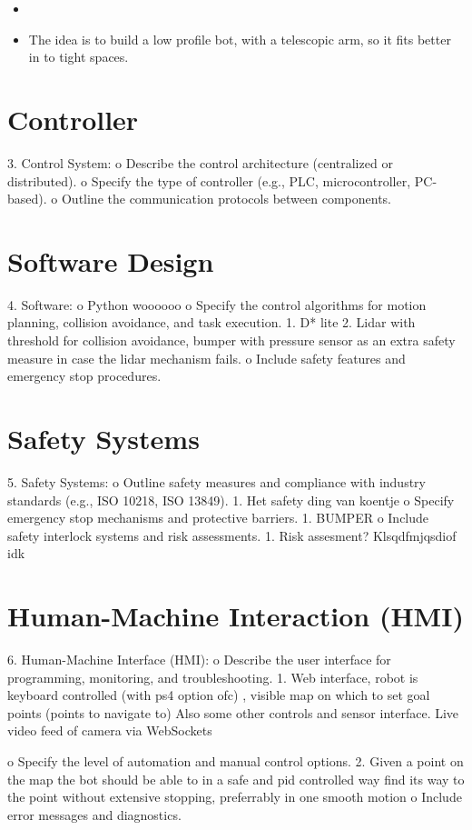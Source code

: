 \documentclass[a4paper]{article}
\begin{document}
\begin{itemize}
    \item 
    \item The idea is to build a low profile bot, with a telescopic arm, so it fits better in to tight spaces.
\end{itemize}

\section*{Controller}
3.	Control System:
o	Describe the control architecture (centralized or distributed).
o	Specify the type of controller (e.g., PLC, microcontroller, PC-based).
o	Outline the communication protocols between components.

\section*{Software Design}
4.	Software:
o	Python woooooo
o	Specify the control algorithms for motion planning, collision avoidance, and task execution.
1.	D* lite
2.	Lidar with threshold for collision avoidance, bumper with pressure sensor as an extra safety measure in case the lidar mechanism fails.
o	Include safety features and emergency stop procedures.

\section*{Safety Systems}
5.	Safety Systems:
o	Outline safety measures and compliance with industry standards (e.g., ISO 10218, ISO 13849).
1. Het safety ding van koentje
o	Specify emergency stop mechanisms and protective barriers.
1. BUMPER
o	Include safety interlock systems and risk assessments.
1. Risk assesment? Klsqdfmjqsdiof idk

\section*{Human-Machine Interaction (HMI)}
6.	Human-Machine Interface (HMI):
o	Describe the user interface for programming, monitoring, and troubleshooting.
1. Web interface, robot is keyboard controlled (with ps4 option ofc) , 		visible map on which to set goal points (points to navigate to)
Also some other controls and sensor interface. Live video feed of 		camera via WebSockets 	

o	Specify the level of automation and manual control options.
2. Given a point on the map the bot should be able to in a safe and pid controlled way find its way to the point without extensive stopping, preferrably in one smooth motion
o	Include error messages and diagnostics.
\end{document}
